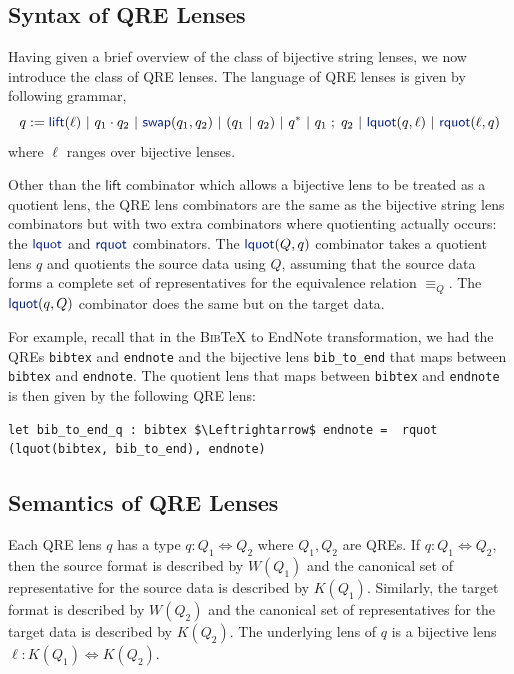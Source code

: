 \documentclass[acmsmall,review,anonymous]{acmart}
\newcommand{\kw}[1]{\textcolor{dkblue}{\ensuremath{\mathsf{#1}}}}
\newcommand{\eqrel}[1]{\ensuremath{\equiv_{#1}}}
\newcommand{\sep}{\ensuremath{\ | \ }}
\newcommand{\bibtex}{\textsc{Bib}\TeX{}}
\newcommand{\swap}{\ensuremath{\kw{swap}}}
\newcommand{\lquot}{\ensuremath{\kw{lquot}}}
\newcommand{\rquot}{\ensuremath{\kw{rquot}}}
\newcommand{\lift}{\ensuremath{\kw{lift}}}
\newcommand{\cd}[1]{\lstinline[backgroundcolor=\color{white}]$#1$}
\begin{document}
\subsection{Syntax of QRE Lenses}
\label{subsec:qre-lenses-syntax}
Having given a brief overview of the class of bijective string lenses, we now
introduce the class of QRE lenses. The language of QRE lenses is given by
following grammar,
$$ q := \lift(\ell) \sep  q_1 \cdot q_2 \sep \swap(q_1, q_2) \sep (q_1 \sep q_2)
\sep q^* \sep q_1 \; ; \; q_2 \sep \lquot(q, \ell) \sep \rquot(\ell, q)$$
where $\ell$ ranges over bijective lenses.

Other than the \kw{lift} combinator which allows a bijective lens to be
treated as a quotient lens, the QRE lens combinators are the same as the
bijective string lens combinators but with two extra combinators where
quotienting actually occurs: the $\lquot$ and $\rquot$ combinators. The
$\lquot(Q, q)$ combinator takes a quotient lens $q$ and quotients the source
data using $Q$, assuming that the source data forms a complete set of
representatives for the equivalence relation $\eqrel{Q}$. The $\lquot(q, Q)$
combinator does the same but on the target data.

For example, recall that in the \bibtex{} to EndNote transformation, we had the
QREs \cd{bibtex} and \cd{endnote} and the bijective lens \cd{bib_to_end}
that maps between 
\cd{bibtex} and \cd{endnote}. The quotient lens that maps between
\cd{bibtex} and \cd{endnote} is then given by the following QRE lens:

\begin{lstlisting}
let bib_to_end_q : bibtex $\Leftrightarrow$ endnote =  rquot (lquot(bibtex, bib_to_end), endnote)
\end{lstlisting}

\subsection{Semantics of QRE Lenses}
\label{subsec:qre-lenses-semantics}
Each QRE lens $q$ has a type $q : Q_1 \Leftrightarrow Q_2$ where $Q_1, Q_2$ are
QREs. If $q : Q_1 \Leftrightarrow Q_2$, then the source format is described by
$W(Q_1)$ and the canonical set of representative for the source data is
described by $K(Q_1)$.
Similarly, the target format is described by $W(Q_2)$ and the canonical set of
representatives for the target data is described by $K(Q_2)$. The underlying
lens of $q$ is a bijective lens $\ell : K(Q_1) \Leftrightarrow K(Q_2)$.
\end{document}
